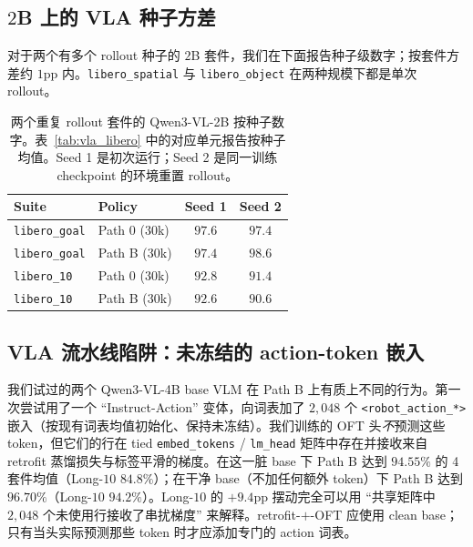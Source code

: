 \documentclass{article}
\begin{document}
\subsection{$2$B 上的 VLA 种子方差}
\label{app:vla_variance}
对于两个有多个 rollout 种子的 $2$B 套件，我们在下面报告种子级数字；按套件方差约 $1$pp 内。\texttt{libero\_spatial} 与 \texttt{libero\_object} 在两种规模下都是单次 rollout。
\begin{table}[h]
\caption{两个重复 rollout 套件的 Qwen3-VL-2B 按种子数字。表~\ref{tab:vla_libero} 中的对应单元报告按种子均值。Seed 1 是初次运行；Seed 2 是同一训练 checkpoint 的环境重置 rollout。}
\label{tab:vla_seed_variance}
\centering\small
\begin{tabular}{llcc}
\toprule
Suite & Policy & Seed 1 & Seed 2 \\
\midrule
\texttt{libero\_goal} & Path 0 ($30$k) & $97.6$ & $97.4$ \\
\texttt{libero\_goal} & Path B ($30$k) & $97.4$ & $98.6$ \\
\texttt{libero\_10}   & Path 0 ($30$k) & $92.8$ & $91.4$ \\
\texttt{libero\_10}   & Path B ($30$k) & $92.6$ & $90.6$ \\
\bottomrule
\end{tabular}
\end{table}

\subsection{VLA 流水线陷阱：未冻结的 action-token 嵌入}
\label{app:vla_pitfall}
我们试过的两个 Qwen3-VL-4B base VLM 在 Path B 上有质上不同的行为。第一次尝试用了一个 ``Instruct-Action'' 变体，向词表加了 $2{,}048$ 个 \texttt{<robot\_action\_*>} 嵌入（按现有词表均值初始化、保持未冻结）。我们训练的 OFT 头\emph{不}预测这些 token，但它们的行在 tied \texttt{embed\_tokens} / \texttt{lm\_head} 矩阵中存在并接收来自 retrofit 蒸馏损失与标签平滑的梯度。在这一脏 base 下 Path B 达到 $94.55\%$ 的 4 套件均值（Long-$10$ $84.8\%$）；在干净 base（不加任何额外 token）下 Path B 达到 $96.70\%$（Long-$10$ $94.2\%$）。Long-$10$ 的 $+9.4$pp 摆动完全可以用 ``共享矩阵中 $2{,}048$ 个未使用行接收了串扰梯度'' 来解释。retrofit-$+$-OFT 应使用 clean base；只有当头实际预测那些 token 时才应添加专门的 action 词表。
\end{document}
